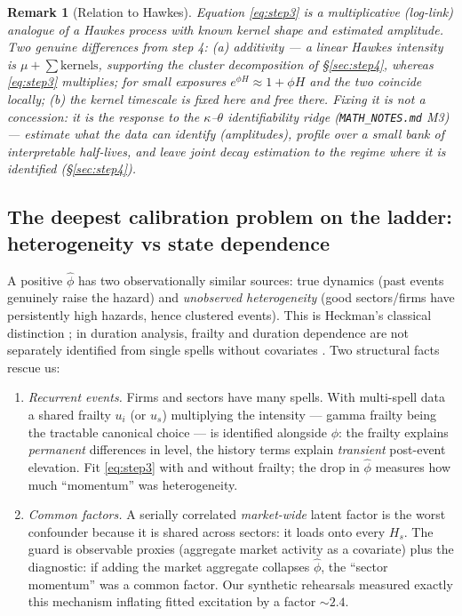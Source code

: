\documentclass[11pt]{article}
\newcommand{\code}[1]{\texttt{#1}}
\newtheorem{remark}{Remark}
\numberwithin{assumption}{section}
\numberwithin{proposition}{section}
\numberwithin{remark}{section}
\begin{document}
\begin{remark}[Relation to Hawkes]
Equation \eqref{eq:step3} is a multiplicative (log-link) analogue of a
Hawkes process with \emph{known} kernel shape and \emph{estimated}
amplitude. Two genuine differences from step 4: (a) additivity --- a linear
Hawkes intensity is $\mu+\sum\text{kernels}$, supporting the cluster
decomposition of \S\ref{sec:step4}, whereas \eqref{eq:step3} multiplies;
for small exposures $e^{\phi H}\approx 1+\phi H$ and the two coincide
locally; (b) the kernel timescale is fixed here and free there. Fixing it
is not a concession: it is the response to the $\kappa$--$\theta$
identifiability ridge (\code{MATH\_NOTES.md} M3) --- estimate what the data
can identify (amplitudes), profile over a small bank of interpretable
half-lives, and leave joint decay estimation to the regime where it is
identified (\S\ref{sec:step4}).
\end{remark}

\subsection{The deepest calibration problem on the ladder:
heterogeneity vs state dependence}
A positive $\hat\phi$ has two observationally similar sources: true
dynamics (past events genuinely raise the hazard) and \emph{unobserved
heterogeneity} (good sectors/firms have persistently high hazards, hence
clustered events). This is Heckman's classical distinction
\citep{heckman1981}; in duration analysis, frailty and duration dependence
are not separately identified from single spells without covariates
\citep{elbersridder1982,lancaster1990}. Two structural facts rescue us:
\begin{enumerate}[leftmargin=1.6em]
\item \emph{Recurrent events.} Firms and sectors have many spells. With
multi-spell data a shared frailty $u_i$ (or $u_s$) multiplying the
intensity --- gamma frailty being the tractable canonical choice
\citep{vaupel1979,nielsen1992} --- is identified alongside $\phi$: the
frailty explains \emph{permanent} differences in level, the history terms
explain \emph{transient} post-event elevation. Fit \eqref{eq:step3} with
and without frailty; the drop in $\hat\phi$ measures how much
``momentum'' was heterogeneity.
\item \emph{Common factors.} A serially correlated \emph{market-wide}
latent factor is the worst confounder because it is shared across sectors:
it loads onto every $H_s$. The guard is observable proxies (aggregate
market activity as a covariate) plus the diagnostic: if adding the market
aggregate collapses $\hat\phi$, the ``sector momentum'' was a common
factor. Our synthetic rehearsals measured exactly this mechanism inflating
fitted excitation by a factor $\sim2.4$.
\end{enumerate}
\end{document}
